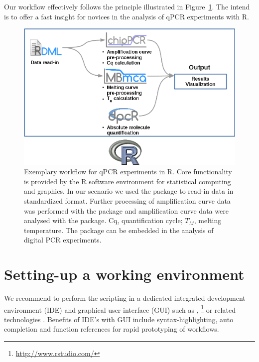 Our workflow effectively follows the principle illustrated in 
Figure~\ref{figure:workflow}. The intend is to offer a fast insight for novices 
in the analysis of qPCR experiments with R.

\begin{figure}[htbp]
  \centering
  \includegraphics{figures/workflow.png}
  \caption{Exemplary workflow for qPCR experiments in R. Core functionality is 
provided by the R software environment for statistical computing and graphics. 
In our scenario we used the  package to read-in data in 
standardized format. Further processing of amplification curve data was 
performed with the  package and amplification curve data were 
analysed with the  package. Cq, quantification cycle; $T_{M}$, 
melting temperature. The  package can be embedded in the analysis 
of digital PCR experiments.
} \label{figure:workflow}
\end{figure}

\section{Setting-up a working environment}

We recommend to perform the scripting in a dedicated integrated development 
environment (IDE) and graphical user interface (GUI) such as  
\citep{rodiger_rkward_2012}, 
\footnote{\url{http://www.rstudio.com/}} or related technologies 
\citep{Valero_2012}. Benefits of IDE's with GUI include syntax-highlighting, 
auto completion and function references for rapid prototyping of workflows.

